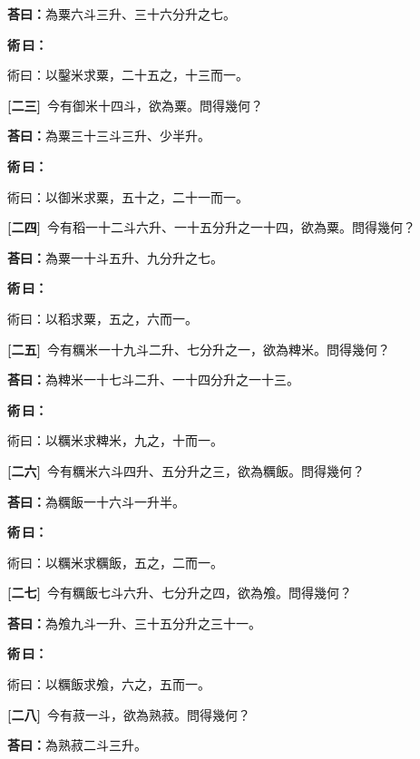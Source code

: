 \documentclass[11pt,a4paper]{article}
\newenvironment{method}{%
  \par\noindent\textcolor{methodcolor}{\textbf{術\,曰：}}%
  \ignorespaces
}{\par\vspace{0.5em}}
\newcommand{\problemnum}[1]{\textbf{[\ignorespaces#1\unskip]}}
\begin{document}
\noindent\textcolor{answercolor}{\textbf{荅曰：}}為粟六斗三升、三十六分升之七。

\begin{method}
術曰：以鑿米求粟，二十五之，十三而一。
\end{method}

\noindent\problemnum{二三}\,
今有御米十四斗，欲為粟。問得幾何？

\noindent\textcolor{answercolor}{\textbf{荅曰：}}為粟三十三斗三升、少半升。

\begin{method}
術曰：以御米求粟，五十之，二十一而一。
\end{method}

\noindent\problemnum{二四}\,
今有稻一十二斗六升、一十五分升之一十四，欲為粟。問得幾何？

\noindent\textcolor{answercolor}{\textbf{荅曰：}}為粟一十斗五升、九分升之七。

\begin{method}
術曰：以稻求粟，五之，六而一。
\end{method}

\noindent\problemnum{二五}\,
今有糲米一十九斗二升、七分升之一，欲為粺米。問得幾何？

\noindent\textcolor{answercolor}{\textbf{荅曰：}}為粺米一十七斗二升、一十四分升之一十三。

\begin{method}
術曰：以糲米求粺米，九之，十而一。
\end{method}

\noindent\problemnum{二六}\,
今有糲米六斗四升、五分升之三，欲為糲飯。問得幾何？

\noindent\textcolor{answercolor}{\textbf{荅曰：}}為糲飯一十六斗一升半。

\begin{method}
術曰：以糲米求糲飯，五之，二而一。
\end{method}

\noindent\problemnum{二七}\,
今有糲飯七斗六升、七分升之四，欲為飧。問得幾何？

\noindent\textcolor{answercolor}{\textbf{荅曰：}}為飧九斗一升、三十五分升之三十一。

\begin{method}
術曰：以糲飯求飧，六之，五而一。
\end{method}

\noindent\problemnum{二八}\,
今有菽一斗，欲為熟菽。問得幾何？

\noindent\textcolor{answercolor}{\textbf{荅曰：}}為熟菽二斗三升。
\end{document}
